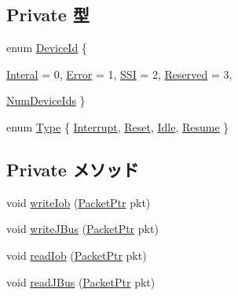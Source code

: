 \subsection*{Private 型}
\begin{DoxyCompactItemize}
\item 
enum \hyperlink{classIob_a066ce0277195d2858dd73d3f2c5f48c4}{DeviceId} \{ \par
\hyperlink{classIob_a066ce0277195d2858dd73d3f2c5f48c4a303dacd808cdfd463b55fd4187054ae3}{Interal} =  0, 
\hyperlink{classIob_a066ce0277195d2858dd73d3f2c5f48c4a4dfd42ec49d09d8c6555c218301cc30f}{Error} =  1, 
\hyperlink{classIob_a066ce0277195d2858dd73d3f2c5f48c4a9519b5f56f6474a2f97052966f157b31}{SSI} =  2, 
\hyperlink{classIob_a066ce0277195d2858dd73d3f2c5f48c4a6136a0872216f91100b42ea04333af70}{Reserved} =  3, 
\par
\hyperlink{classIob_a066ce0277195d2858dd73d3f2c5f48c4ace7a692c78ae293ccaee297d424cd467}{NumDeviceIds}
 \}
\item 
enum \hyperlink{classIob_a1d1cfd8ffb84e947f82999c682b666a7}{Type} \{ \hyperlink{classIob_a1d1cfd8ffb84e947f82999c682b666a7ad165056706a57f6f8d2a171e9bbeebc6}{Interrupt}, 
\hyperlink{classIob_a1d1cfd8ffb84e947f82999c682b666a7a92793663441ced378f4676b8a6524385}{Reset}, 
\hyperlink{classIob_a1d1cfd8ffb84e947f82999c682b666a7ad3fa9ae9431d6cb1772f9d9df48cab19}{Idle}, 
\hyperlink{classIob_a1d1cfd8ffb84e947f82999c682b666a7a3e76e0644dbaf318b389719aab4e87da}{Resume}
 \}
\end{DoxyCompactItemize}
\subsection*{Private メソッド}
\begin{DoxyCompactItemize}
\item 
void \hyperlink{classIob_a4683924656f7e6ca641aab7310aae530}{writeIob} (\hyperlink{classPacket}{PacketPtr} pkt)
\item 
void \hyperlink{classIob_adfe6eb5eebb6cfad3bd50b969ef744c6}{writeJBus} (\hyperlink{classPacket}{PacketPtr} pkt)
\item 
void \hyperlink{classIob_ab4cf9411b48d0baf8e0788b840c8256a}{readIob} (\hyperlink{classPacket}{PacketPtr} pkt)
\item 
void \hyperlink{classIob_a04a9ec2ef24eaa5002c2c211e83e4067}{readJBus} (\hyperlink{classPacket}{PacketPtr} pkt)
\end{DoxyCompactItemize}
